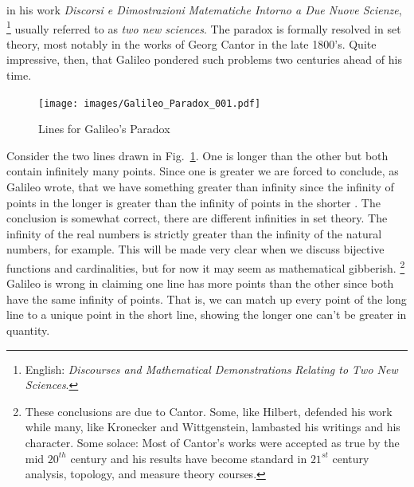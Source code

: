             in his work \textit{Discorsi e Dimostrazioni}
            \textit{Matematiche Intorno a Due Nuove Scienze},%
            \footnote{%
                English: \textit{Discourses and Mathematical Demonstrations}
                \textit{Relating to Two New Sciences}.
            }
            usually referred to as \textit{two new sciences}. The paradox is
            formally resolved in set theory, most notably in the works of Georg
            Cantor in the late 1800's. Quite impressive, then, that Galileo
            pondered such problems two centuries ahead of his time.
            \begin{figure}[H]
                \centering
                \captionsetup{type=figure}
                \if{}
                    \texttt{[image: images/Galileo\_Paradox\_001.pdf]}
                \fi
                \caption{Lines for Galileo's Paradox}
                \label{fig:Galileo_Paradox_001}
            \end{figure}
            Consider the two lines drawn in Fig.~\ref{fig:Galileo_Paradox_001}.
            One is longer than the other but both contain infinitely many
            points. Since one is greater we are forced to conclude, as Galileo
            wrote, that we have something greater than infinity since the
            infinity of points in the longer is greater than the infinity of
            points in the shorter \cite{GalileoTwoNewSciences}. The conclusion
            is somewhat correct, there are different infinities in set theory.
            The infinity of the real numbers is strictly greater than the
            infinity of the natural numbers, for example. This will be made very
            clear when we discuss bijective functions and cardinalities, but for
            now it may seem as mathematical gibberish.%
            \footnote{%
                These conclusions are due to Cantor. Some, like Hilbert,
                defended his work while many, like Kronecker and Wittgenstein,
                lambasted his writings and his character. Some solace: Most of
                Cantor's works were accepted as true by the mid $20^{th}$
                century and his results have become standard in $21^{st}$
                century analysis, topology, and measure theory courses.
            }
            Galileo is wrong in claiming one line has more points than the other
            since both have the same infinity of points. That is, we can match
            up every point of the long line to a unique point in the short line,
            showing the longer one can't be greater in quantity.
